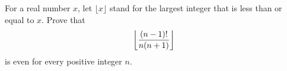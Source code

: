 For a real number $x$, let $\lfloor x\rfloor$ stand for the largest integer that is less than or equal to $x$. Prove that \[ \left\lfloor{(n-1)!\over n(n+1)}\right\rfloor \] is even for every positive integer $n$.